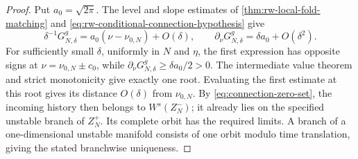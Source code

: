 \begin{proof}
Put \(a_0=\sqrt{2\pi}\).  The level and slope estimates of
\cref{thm:rw-local-fold-matching} and
\eqref{eq:rw-conditional-connection-hypothesis} give
\begin{equation}
 \delta^{-1}G_{N,\delta}^g
       =a_0(\nu-\nu_{0,N})+O(\delta),
 \qquad
 \partial_\nu G_{N,\delta}^g=\delta a_0+O(\delta^2).
 \label{eq:connection-function-estimates}
\end{equation}
For sufficiently small \(\delta\), uniformly in \(N\) and \(\eta\),
the first expression has opposite signs at
\(\nu=\nu_{0,N}\pm c_0\), while
\(\partial_\nu G_{N,\delta}^g\ge\delta a_0/2>0\).
The intermediate value theorem and strict monotonicity give exactly one
root.  Evaluating the first estimate at this root gives its distance
\(O(\delta)\) from \(\nu_{0,N}\).
By \eqref{eq:connection-zero-set}, the incoming history then belongs to
\(W^s(Z_N^-)\); it already lies on the specified unstable branch of
\(Z_N^+\).  Its complete orbit has the required limits.  A branch of a
one-dimensional unstable manifold consists of one orbit modulo time
translation, giving the stated branchwise uniqueness.
\end{proof}


